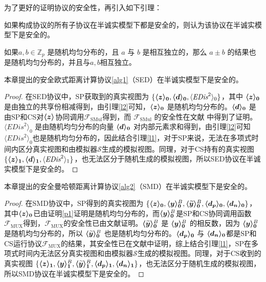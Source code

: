 为了更好的证明协议的安全性，再引入如下引理：
\begin{lemma}\label{l1}
	如果构成协议的所有子协议在半诚实模型下都是安全的，则认为该协议在半诚实模型下是安全的\cite{bi2020design}。
\end{lemma}

\begin{lemma}\label{l2}
	如果$ a, b \in \mathbb{Z}_p$ 是随机均匀分布的，且 $a$ 与 $b$ 是相互独立的，那么 $a \pm b$ 的结果也是随机均匀分布的，并且与$a,b$相互独立\cite{bogdanov2008sharemind}。
\end{lemma}

\begin{theorem}
	本章提出的安全欧式距离计算协议\ref{alg1}（SED）在半诚实模型下是安全的。
\end{theorem}

\begin{proof}\label{p1}
	在SED协议中，SP获取到的真实视图为 $\{\svec[0]{z}, \svec[0]{d}, \langle \textit{EDis}^2\rangle_0\}$，其中 $\svec[0]{z}$ 是由独立的共享份相减得到，由引理\ref{l2}可知，$\svec[0]{z}$ 是随机均匀分布的。$\svec[0]{d}$ 是由SP和CS对$\svec{z}$协同调用$\mathcal{F}_{\text {SMul}}$得到，而 $\mathcal{F}_{\text {SMul}}$ 的安全性在文献 \cite{rathee2021sirnn} 中得到了证明。$\langle \textit{EDis}^2\rangle_0$ 是由随机均匀分布的向量 $\svec[0]{d}$ 对内部元素求和得到，由引理\ref{l2}可知$\langle \textit{EDis}^2\rangle_0$也是随机均匀分布的，因此结合引理\ref{l1}，对于SP来说，无法在多项式时间内区分真实视图和由模拟器$\mathcal{S}$生成的模拟视图。同理，对于CS持有的真实视图 $\{\svec[1]{z}, \svec[1]{d}, \langle \textit{EDis}^2\rangle_1\}$，也无法区分于随机生成的模拟视图，所以SED协议在半诚实模型下是安全的。
\end{proof}

\begin{theorem}
	本章提出的安全曼哈顿距离计算协议\ref{alg2}（SMD）在半诚实模型下是安全的。
\end{theorem}

\begin{proof}\label{p2}
	在SMD协议中，SP得到的真实视图为 $\{\svec[0]{z}, \svec[0]{y}^B, \svec[0]{\widetilde{y}}^B, \svec[0]{d_p}, \svec[0]{d_n}\}$，其中$\svec[0]{z}$已由证明\ref{p1}证明是随机均匀分布的，而$\svec[0]{y}^B$是SP和CS协同调用函数 $\mathcal{F}_{\text {MUX}}$得到，$\mathcal{F}_{\text {MUX}}$的安全性已由文献\cite{rathee2021sirnn}证明。$\svec[0]{\widetilde{y}}^B$ 是 $\svec[0]{y}^B$ 的相反数，因为 $\svec[0]{y}^B$ 是随机均匀分布的，所以 $\svec[0]{\widetilde{y}}^B$ 也是随机均匀分布的。$\svec[0]{d_p}$ 与 $\svec[0]{d_n}$都是SP和CS运行协议$\mathcal{F}_{\text {MUX}}$的结果，其安全性已在文献\cite{rathee2021sirnn}中证明，综上结合引理\ref{l1}，SP在多项式时间内无法区分真实视图和由模拟器$\mathcal{S}$生成的模拟视图。同理，对于CS收到的真实视图 $\{\svec[1]{z}, \svec[1]{y}^B, \svec[1]{\widetilde{y}}^B, \svec[1]{d_p}, \svec[1]{d_n}\}$，也无法区分于随机生成的模拟视图，所以SMD协议在半诚实模型下是安全的。
\end{proof}

